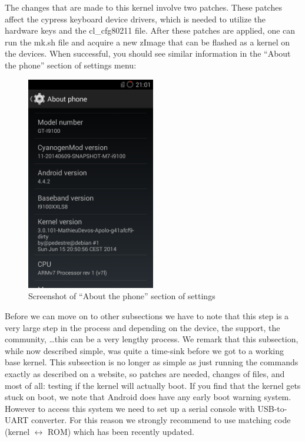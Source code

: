 The changes that are made to this kernel involve two patches. These patches affect the cypress keyboard device drivers, which is needed to utilize the hardware keys and the cl\_cfg80211 file. After these patches are applied, one can run the mk.sh file and acquire a new zImage that can be flashed as a kernel on the devices. When successful, you should see similar information in the ``About the phone'' section of settings menu:
\npar
\begin{figure}[H]
    \centering
    \includegraphics[width=0.5\textwidth]{figures/screenshot-kernel-i9100}
    \caption{Screenshot of ``About the phone'' section of settings} 
    \label{fig:screenshot-kernel-i9100}
\end{figure}

\npar

Before we can move on to other subsections we have to note that this step is a very large step in the process and depending on the device, the support, the community, \ldots this can be a very lengthy process. We remark that this subsection, while now described simple, was quite a time-sink before we got to a working base kernel. This subsection is no longer as simple as just running the commands exactly as described on a website, so patches are needed, changes of files, and most of all: testing if the kernel will actually boot. If you find that the kernel gets stuck on boot, we note that Android does have any early boot warning system. However to access this system we need to set up a serial console with USB-to-UART converter. For this reason we strongly recommend to use matching code (kernel $\leftrightarrow$ ROM) which has been recently updated. 

